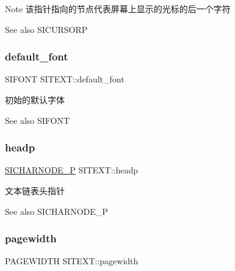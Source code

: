 \begin{DoxyNote}{Note}
该指针指向的节点代表屏幕上显示的光标的后一个字符 
\end{DoxyNote}
\begin{DoxySeeAlso}{See also}
S\+I\+C\+U\+R\+S\+O\+RP 
\end{DoxySeeAlso}
\mbox{\label{class_s_i_t_e_x_t_abdacda1b7e48087a0aa2905702cb1d68}} 
\subsubsection{\texorpdfstring{default\+\_\+font}{default\_font}}
{\footnotesize\ttfamily S\+I\+F\+O\+NT S\+I\+T\+E\+X\+T\+::default\+\_\+font}



初始的默认字体 

\begin{DoxySeeAlso}{See also}
S\+I\+F\+O\+NT 
\end{DoxySeeAlso}
\mbox{\label{class_s_i_t_e_x_t_a50c3c59ac0a71a940d688e9d4d901bee}} 
\subsubsection{\texorpdfstring{headp}{headp}}
{\footnotesize\ttfamily \hyperlink{class_s_i_c_h_a_r_n_o_d_e}{S\+I\+C\+H\+A\+R\+N\+O\+D\+E\+\_\+P} S\+I\+T\+E\+X\+T\+::headp}



文本链表头指针 

\begin{DoxySeeAlso}{See also}
S\+I\+C\+H\+A\+R\+N\+O\+D\+E\+\_\+P 
\end{DoxySeeAlso}
\mbox{\label{class_s_i_t_e_x_t_afcb828b5d1da58d0f60088097e8c107b}} 
\subsubsection{\texorpdfstring{pagewidth}{pagewidth}}
{\footnotesize\ttfamily P\+A\+G\+E\+W\+I\+D\+TH S\+I\+T\+E\+X\+T\+::pagewidth}



